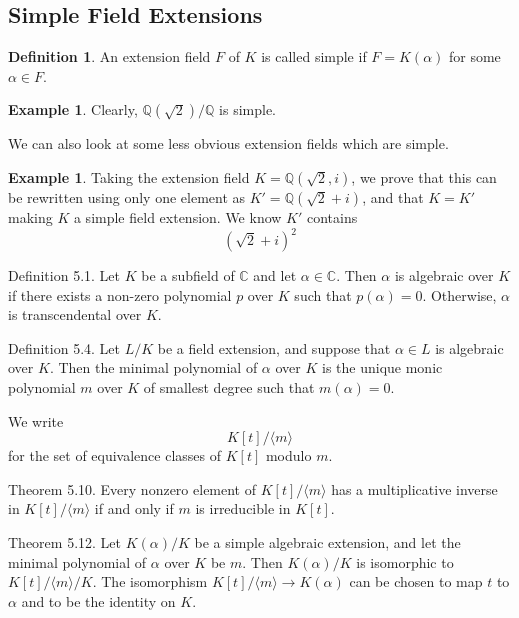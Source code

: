 \documentclass[12pt]{article}
\theoremstyle{definition}
\newtheorem{definition}[theorem]{Definition}
\newtheorem{example}[theorem]{Example}
\newcommand{\Q}{\mathbb Q}
\begin{document}
\subsection{Simple Field Extensions}
\begin{definition}
An extension field \(F\) of \(K\) is called simple if \(F = K(\alpha)\) for some \(\alpha \in F\).
\end{definition}
\begin{example}
Clearly, \(\mathbb{Q}(\sqrt{2}) / \Q\) is simple.
\end{example}
We can also look at some less obvious extension fields which are simple.
\begin{example}
Taking the extension field \(K = \mathbb{Q}(\sqrt{2}, i)\), we prove that this can be rewritten using only one element as \(K' = \mathbb{Q}(\sqrt{2} + i)\), and that \(K=K'\) making \(K\) a simple field extension. We know \(K'\) contains
\[(\sqrt{2} + i)^2\]
\end{example}

Definition 5.1. Let $K$ be a subfield of $\mathbb{C}$ and let $\alpha \in \mathbb{C}$. Then $\alpha$ is algebraic over $K$ if there exists a non-zero polynomial $p$ over $K$ such that $p(\alpha)=0$. Otherwise, $\alpha$ is transcendental over $K$.

Definition 5.4. Let $L / K$ be a field extension, and suppose that $\alpha \in L$ is algebraic over $K$. Then the minimal polynomial of $\alpha$ over $K$ is the unique monic polynomial $m$ over $K$ of smallest degree such that $m(\alpha)=0$.

We write
$$
K[t] /\langle m\rangle
$$
for the set of equivalence classes of $K[t]$ modulo $m$. 

Theorem 5.10. Every nonzero element of $K[t] /\langle m\rangle$ has a multiplicative inverse in $K[t] /\langle m\rangle$ if and only if $m$ is irreducible in $K[t]$.

Theorem 5.12. Let $K(\alpha) / K$ be a simple algebraic extension, and let the minimal polynomial of $\alpha$ over $K$ be $m$. Then $K(\alpha) / K$ is isomorphic to $K[t] /\langle m\rangle / K$. The isomorphism $K[t] /\langle m\rangle \rightarrow K(\alpha)$ can be chosen to map $t$ to $\alpha$ and to be the identity on $K$.
\end{document}
